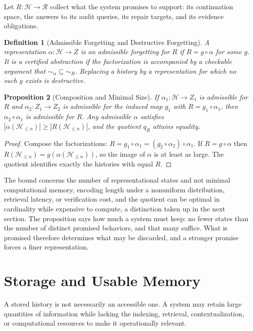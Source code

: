 \documentclass[12pt,oneside,openany]{book}
\theoremstyle{spherepop}
\newtheorem{definition}{Definition}[chapter]
\newtheorem{proposition}[definition]{Proposition}
\theoremstyle{remarkstyle}
\newcommand{\calH}{\mathcal{H}}
\begin{document}
Let $R:\calH\to\mathcal R$ collect what the system promises to support: its continuation space, the answers to its audit queries, its repair targets, and its evidence obligations.

\begin{definition}[Admissible Forgetting and Destructive Forgetting]
A representation $\alpha:\calH\to Z$ is an \emph{admissible forgetting} for $R$ if $R=g\circ\alpha$ for some $g$. It is a \emph{certified abstraction} if the factorization is accompanied by a checkable argument that ${\sim_\alpha}\subseteq{\sim_R}$. Replacing a history by a representation for which no such $g$ exists is \emph{destructive}.
\end{definition}

\begin{proposition}[Composition and Minimal Size]
\label{prop:forget}
If $\alpha_1:\calH\to Z_1$ is admissible for $R$ and $\alpha_2:Z_1\to Z_2$ is admissible for the induced map $g_1$ with $R=g_1\circ\alpha_1$, then $\alpha_2\circ\alpha_1$ is admissible for $R$. Any admissible $\alpha$ satisfies $|\alpha(\calH_{\le n})|\ge|R(\calH_{\le n})|$, and the quotient $q_R$ attains equality.
\end{proposition}

\begin{proof}
Compose the factorizations: $R=g_1\circ\alpha_1=(g_2\circ\alpha_2)\circ\alpha_1$. If $R=g\circ\alpha$ then $R(\calH_{\le n})=g(\alpha(\calH_{\le n}))$, so the image of $\alpha$ is at least as large. The quotient identifies exactly the histories with equal $R$.
\end{proof}

The bound concerns the number of representational states and not minimal computational memory, encoding length under a nonuniform distribution, retrieval latency, or verification cost, and the quotient can be optimal in cardinality while expensive to compute, a distinction taken up in the next section. The proposition says how much a system must keep: no fewer states than the number of distinct promised behaviors, and that many suffice. What is promised therefore determines what may be discarded, and a stronger promise forces a finer representation.

\section{Storage and Usable Memory}

A stored history is not necessarily an accessible one. A system may retain large quantities of information while lacking the indexing, retrieval, contextualization, or computational resources to make it operationally relevant.
\end{document}
